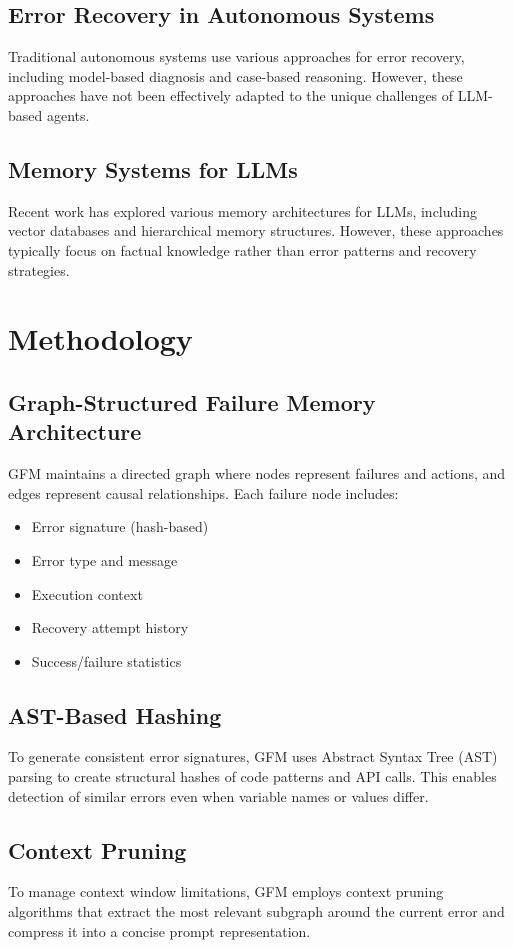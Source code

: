 \documentclass{conference}
\begin{document}
\subsection{Error Recovery in Autonomous Systems}
Traditional autonomous systems use various approaches for error recovery, including model-based diagnosis and case-based reasoning. However, these approaches have not been effectively adapted to the unique challenges of LLM-based agents.

\subsection{Memory Systems for LLMs}
Recent work has explored various memory architectures for LLMs, including vector databases and hierarchical memory structures. However, these approaches typically focus on factual knowledge rather than error patterns and recovery strategies.

\section{Methodology}

\subsection{Graph-Structured Failure Memory Architecture}
GFM maintains a directed graph where nodes represent failures and actions, and edges represent causal relationships. Each failure node includes:
\begin{itemize}
    \item Error signature (hash-based)
    \item Error type and message
    \item Execution context
    \item Recovery attempt history
    \item Success/failure statistics
\end{itemize}

\subsection{AST-Based Hashing}
To generate consistent error signatures, GFM uses Abstract Syntax Tree (AST) parsing to create structural hashes of code patterns and API calls. This enables detection of similar errors even when variable names or values differ.

\subsection{Context Pruning}
To manage context window limitations, GFM employs context pruning algorithms that extract the most relevant subgraph around the current error and compress it into a concise prompt representation.
\end{document}
